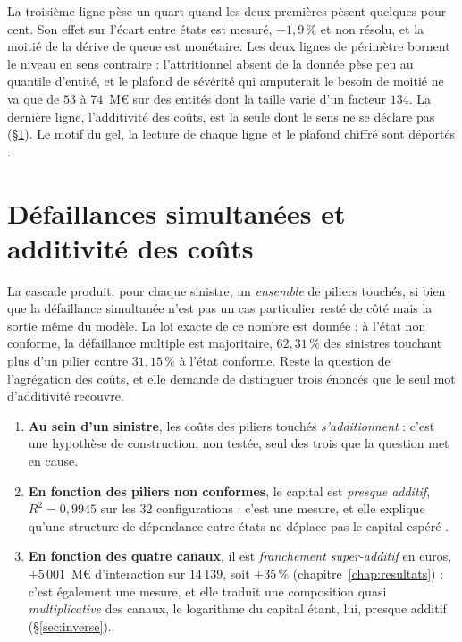 \vspace{2pt}
\noindent La troisième ligne pèse un quart quand les deux premières pèsent quelques
pour cent. Son effet sur l'écart entre états est mesuré, $-1{,}9\,\%$ et non résolu, et la moitié
de la dérive de queue est monétaire. Les deux lignes de périmètre bornent le niveau en sens
contraire : l'attritionnel absent de la donnée pèse peu au quantile d'entité, et le plafond de
sévérité qui amputerait le besoin de moitié ne va que de $53$ à $74$~M\euro{} sur des entités
dont la taille varie d'un facteur $134$. La dernière ligne, l'additivité des coûts, est la seule
dont le sens ne se déclare pas (\S\ref{sec:additivite-couts}). Le motif du gel, la lecture de
chaque ligne et le plafond chiffré sont déportés \matcomp.

\vspace{2pt}

\section{Défaillances simultanées et additivité des coûts}
\label{sec:additivite-couts}

La cascade produit, pour chaque sinistre, un \emph{ensemble} de piliers touchés, si bien que la
défaillance simultanée n'est pas un cas particulier resté de côté mais la sortie même du modèle. La
loi exacte de ce nombre est donnée \matcomp : à l'état non conforme, la
défaillance multiple est majoritaire, $62{,}31\,\%$ des sinistres touchant plus d'un
pilier contre $31{,}15\,\%$ à l'état conforme. Reste la question de l'agrégation
des coûts, et elle demande de distinguer trois énoncés que le seul mot d'additivité recouvre.

\begin{enumerate}[leftmargin=*,itemsep=2pt]
\item \textbf{Au sein d'un sinistre}, les coûts des piliers touchés \emph{s'additionnent} : c'est
une hypothèse de construction, non testée, seul des trois que la question met en cause.
\item \textbf{En fonction des piliers non conformes}, le capital est \emph{presque additif},
$R^2=0{,}9945$ sur les $32$ configurations : c'est une mesure, et elle explique qu'une structure de
dépendance entre états ne déplace pas le capital espéré \matcomp.
\item \textbf{En fonction des quatre canaux}, il est \emph{franchement super-additif} en euros,
$+5\,001$~M\euro{} d'interaction sur $14\,139$, soit $+35\,\%$ (chapitre~\ref{chap:resultats}) :
c'est également une mesure, et elle traduit une composition quasi \emph{multiplicative} des
canaux, le logarithme du capital étant, lui, presque additif (\S\ref{sec:inverse}).
\end{enumerate}

